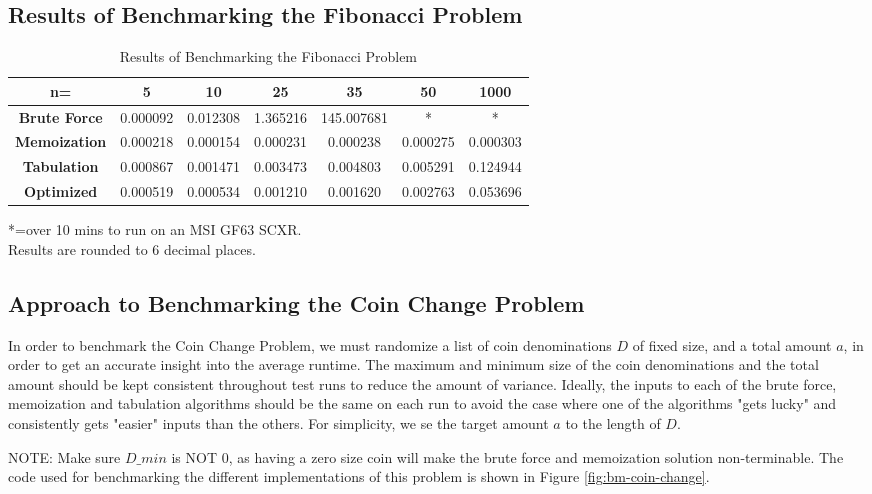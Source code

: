 \subsection{Results of Benchmarking the Fibonacci Problem}
\begin{table}[H]
    \centering
    \begin{tabular}{|c|c|c|c|c|c|c|}
        \hline
        \textbf{n=}  & \textbf{5} & \textbf{10} & \textbf{25} & \textbf{35} & \textbf{50}  & \textbf{1000} \\
        \hline
        \textbf{Brute Force} & 0.000092 & 0.012308 & 1.365216 & 145.007681 & * & * \\
        \hline
        \textbf{Memoization} & 0.000218 & 0.000154 & 0.000231 & 0.000238 & 0.000275 & 0.000303 \\
        \hline
        \textbf{Tabulation} & 0.000867 & 0.001471 & 0.003473 & 0.004803 & 0.005291 & 0.124944 \\
        \hline
        \textbf{Optimized} & 0.000519 & 0.000534 & 0.001210 & 0.001620 & 0.002763 & 0.053696 \\
        \hline
    \end{tabular}
    \caption{Results of Benchmarking the Fibonacci Problem}
\end{table}

*=over 10 mins to run on an MSI GF63 SCXR.\\
Results are rounded to 6 decimal places.


\subsection{Approach to Benchmarking the Coin Change Problem}

In order to benchmark the Coin Change Problem, we must randomize a list of coin denominations $D$ of fixed size, and a total amount $a$, in order to get an accurate insight into the average runtime.
The maximum and minimum size of the coin denominations and the total amount should be kept consistent throughout test runs to reduce the amount of variance.
Ideally, the inputs to each of the brute force, memoization and tabulation algorithms should be the same on each run to avoid the case where one of the algorithms "gets lucky" and consistently gets "easier" inputs than the others.
For simplicity, we se the target amount $a$ to the length of $D$.

NOTE: Make sure $D\_min$ is NOT 0, as having a zero size coin will make the brute force and memoization solution non-terminable.
The code used for benchmarking the different implementations of this problem is shown in Figure \ref{fig:bm-coin-change}.

